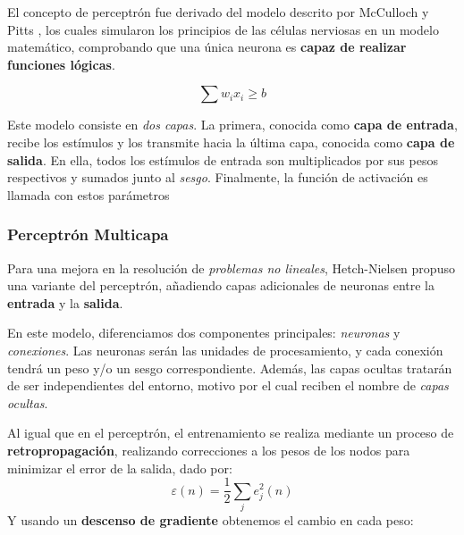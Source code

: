 El concepto de perceptrón fue derivado del modelo descrito por McCulloch y Pitts \cite{McCulloh1943ANets}, los cuales simularon los principios de las células nerviosas en un modelo matemático, comprobando que una única neurona es \textbf{capaz de realizar funciones lógicas}.

\begin{equation}
\sum w_{i}x_{i} \ge b
\end{equation}

Este modelo consiste en \textit{dos capas}. La primera, conocida como \textbf{capa de entrada}, recibe los estímulos y los transmite hacia la última capa, conocida como \textbf{capa de salida}. En ella, todos los estímulos de entrada son multiplicados por sus pesos respectivos y sumados junto al \textit{sesgo}. Finalmente, la función de activación es llamada con estos parámetros 


\subsubsection{Perceptrón Multicapa}

Para una mejora en la resolución de \textit{problemas no lineales}, Hetch-Nielsen propuso una variante del perceptrón, añadiendo capas adicionales de neuronas entre la \textbf{entrada} y la \textbf{salida}\cite{Hecht-Nielsen1989Neurocomputing}.


En este modelo, diferenciamos dos componentes principales: \textit{neuronas} y \textit{conexiones}. Las neuronas serán las unidades de procesamiento, y cada conexión tendrá un peso y/o un sesgo correspondiente. Además, las capas ocultas tratarán de ser independientes del entorno, motivo por el cual reciben el nombre de \textit{capas ocultas}.

Al igual que en el perceptrón, el entrenamiento se realiza mediante un proceso de \textbf{retropropagación}, realizando correcciones a los pesos de los nodos para minimizar el error de la salida, dado por\cite{Haykin1998NeuralFoundation}:
\begin{equation}
    \varepsilon (n) = \frac{1}{2}\sum_{j}e_{j}^2(n)
\end{equation}
Y usando un \textbf{descenso de gradiente} obtenemos el cambio en cada peso\cite{Haykin1998NeuralFoundation}:

